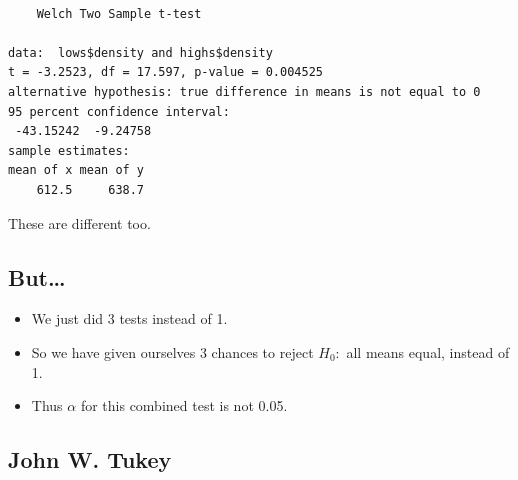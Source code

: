 \documentclass[
  letterpaper,
  DIV=11,
  numbers=noendperiod]{scrartcl}
\newenvironment{Shaded}{\begin{snugshade}}{\end{snugshade}}
\newcommand{\FunctionTok}[1]{\textcolor[rgb]{0.28,0.35,0.67}{#1}}
\newcommand{\NormalTok}[1]{\textcolor[rgb]{0.00,0.23,0.31}{#1}}
\newcommand{\SpecialCharTok}[1]{\textcolor[rgb]{0.37,0.37,0.37}{#1}}
\providecommand{\tightlist}{%
  \setlength{\itemsep}{0pt}\setlength{\parskip}{0pt}}\usepackage{longtable,booktabs,array}
\begin{document}
\begin{Shaded}
\end{Shaded}

\begin{verbatim}

    Welch Two Sample t-test

data:  lows$density and highs$density
t = -3.2523, df = 17.597, p-value = 0.004525
alternative hypothesis: true difference in means is not equal to 0
95 percent confidence interval:
 -43.15242  -9.24758
sample estimates:
mean of x mean of y 
    612.5     638.7 
\end{verbatim}

These are different too.

\hypertarget{but}{%
\subsection{But\ldots{}}\label{but}}

\begin{itemize}
\tightlist
\item
  We just did 3 tests instead of 1.
\item
  So we have given ourselves 3 chances to reject \(H_0:\) all means
  equal, instead of 1.
\item
  Thus \(\alpha\) for this combined test is not 0.05.
\end{itemize}

\hypertarget{john-w.-tukey}{%
\subsection{John W. Tukey}\label{john-w.-tukey}}
\end{document}
